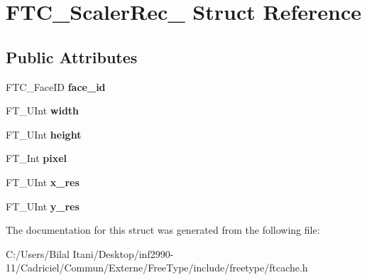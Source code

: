 \hypertarget{struct_f_t_c___scaler_rec__}{}\section{F\+T\+C\+\_\+\+Scaler\+Rec\+\_\+ Struct Reference}
\label{struct_f_t_c___scaler_rec__}
\subsection*{Public Attributes}
\begin{DoxyCompactItemize}
\item 
F\+T\+C\+\_\+\+Face\+ID {\bfseries face\+\_\+id}\hypertarget{struct_f_t_c___scaler_rec___a8e963aa619409e646558fe7aa272e81f}{}\label{struct_f_t_c___scaler_rec___a8e963aa619409e646558fe7aa272e81f}

\item 
F\+T\+\_\+\+U\+Int {\bfseries width}\hypertarget{struct_f_t_c___scaler_rec___a11e13d907ca4661bf7c1d98fffecf321}{}\label{struct_f_t_c___scaler_rec___a11e13d907ca4661bf7c1d98fffecf321}

\item 
F\+T\+\_\+\+U\+Int {\bfseries height}\hypertarget{struct_f_t_c___scaler_rec___a9b3a9b4d7148bbaa4daaae1e1fbb2dbc}{}\label{struct_f_t_c___scaler_rec___a9b3a9b4d7148bbaa4daaae1e1fbb2dbc}

\item 
F\+T\+\_\+\+Int {\bfseries pixel}\hypertarget{struct_f_t_c___scaler_rec___ab78868341e2d66f17e6f1d77e9e054d2}{}\label{struct_f_t_c___scaler_rec___ab78868341e2d66f17e6f1d77e9e054d2}

\item 
F\+T\+\_\+\+U\+Int {\bfseries x\+\_\+res}\hypertarget{struct_f_t_c___scaler_rec___a886c7c1230dc5d5e6b3fc32d06274752}{}\label{struct_f_t_c___scaler_rec___a886c7c1230dc5d5e6b3fc32d06274752}

\item 
F\+T\+\_\+\+U\+Int {\bfseries y\+\_\+res}\hypertarget{struct_f_t_c___scaler_rec___accb53c7a9aeebb41c05f48d14d3dfe71}{}\label{struct_f_t_c___scaler_rec___accb53c7a9aeebb41c05f48d14d3dfe71}

\end{DoxyCompactItemize}


The documentation for this struct was generated from the following file\+:\begin{DoxyCompactItemize}
\item 
C\+:/\+Users/\+Bilal Itani/\+Desktop/inf2990-\/11/\+Cadriciel/\+Commun/\+Externe/\+Free\+Type/include/freetype/ftcache.\+h\end{DoxyCompactItemize}
